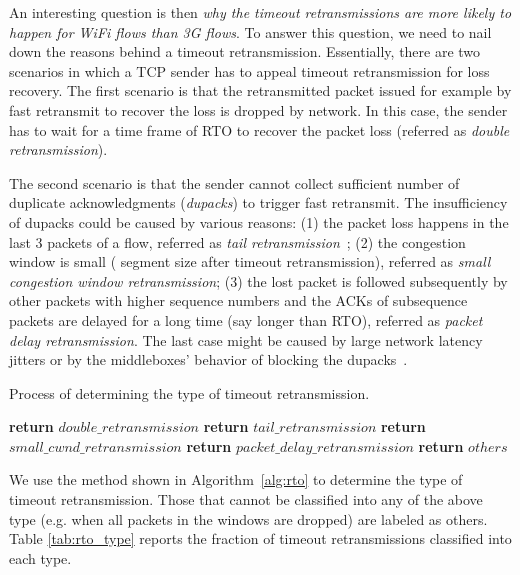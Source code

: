 An interesting question is then \textit{why the timeout retransmissions are more likely to happen for WiFi flows than 3G flows}. To answer this question, we need to nail down the reasons behind a timeout retransmission. Essentially, there are two scenarios in which a TCP sender has to appeal timeout retransmission for loss recovery. The first scenario is that the retransmitted packet issued for example by fast retransmit to recover the loss is dropped by network. In this case, the sender has to wait for a time frame of RTO to recover the packet loss (referred as \emph{double retransmission}). 

The second scenario is that the sender cannot collect sufficient number of duplicate acknowledgments (\emph{dupacks}) to trigger fast retransmit. The insufficiency of dupacks could be caused by various reasons: (1) the packet loss happens in the last 3 packets of a flow, referred as \emph{tail retransmission}~\cite{flach2013reducing}; (2) the congestion window is small ( segment size after timeout retransmission), referred as \emph{small congestion window retransmission}; (3) the lost packet is followed subsequently by other packets with higher sequence numbers and the ACKs of subsequence packets are delayed for a long time (say longer than RTO), referred as \emph{packet delay retransmission}. The last case might be caused by large network latency jitters or by the middleboxes' behavior of blocking the dupacks~\cite{honda2011isit}. 

\begin{algorithm}
	\caption{Process of determining the type of timeout retransmission.}
	\label{alg:rto}
	\begin{algorithmic}[1]
				\State \textbf{return} $double\_retransmission$
				\State \textbf{return} $tail\_retransmission$
				\State \textbf{return} $small\_cwnd\_retransmission$
				\State \textbf{return} $packet\_delay\_retransmission$
			\Else
				\State \textbf{return} $others$
			\EndIf
		\EndProcedure
	\end{algorithmic}
\end{algorithm}

We use the method shown in Algorithm~\ref{alg:rto} to determine the type of timeout retransmission. Those that cannot be classified into any of the above type (e.g. when all packets in the windows are dropped) are labeled as others. Table \ref{tab:rto_type} reports the fraction of timeout retransmissions classified into each type.

